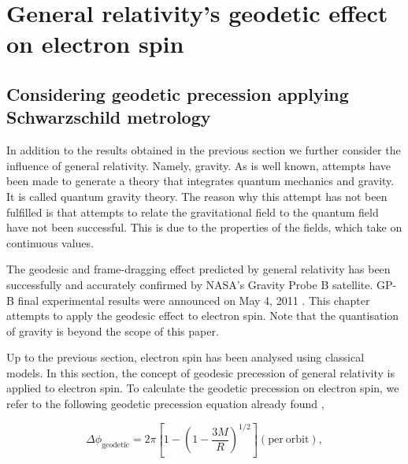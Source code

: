 \documentclass[%
 reprint,
 amsmath,amssymb,
 aps,
]{revtex4-1}
\numberwithin{equation}{section}%
\begin{document}
\section{General relativity's geodetic effect on electron spin}
\subsection{Considering geodetic precession applying Schwarzschild metrology}



In addition to the results obtained in the previous section we further consider the influence of general relativity. Namely, gravity. As is well known, attempts have been made to generate a theory that integrates quantum mechanics and gravity. It is called quantum gravity theory. The reason why this attempt has not been fulfilled is that attempts to relate the gravitational field to the quantum field have not been successful. This is due to the properties of the fields, which take on continuous values.

The geodesic and frame-dragging effect predicted by general relativity has been successfully and accurately confirmed by NASA's Gravity Probe B satellite. GP-B final experimental results were announced on May 4, 2011 \cite{NASA}. This chapter attempts to apply the geodesic effect to electron spin. Note that the quantisation of gravity is beyond the scope of this paper.

Up to the previous section, electron spin has been analysed using classical models. In this section, the concept of geodesic precession of general relativity is applied to electron spin. To calculate the geodetic precession on electron spin, we refer to the following geodetic precession equation already found \cite{Hartle},



\begin{equation}
    \Delta \phi_{\mathrm{geodetic}} = 2 \pi \left[ 1 - \left( 1 - \frac{3M}{R} \right)^{1/2} \right] \mathrm{(per \ orbit)},
    \label{IV.1}
\end{equation}
\end{document}
